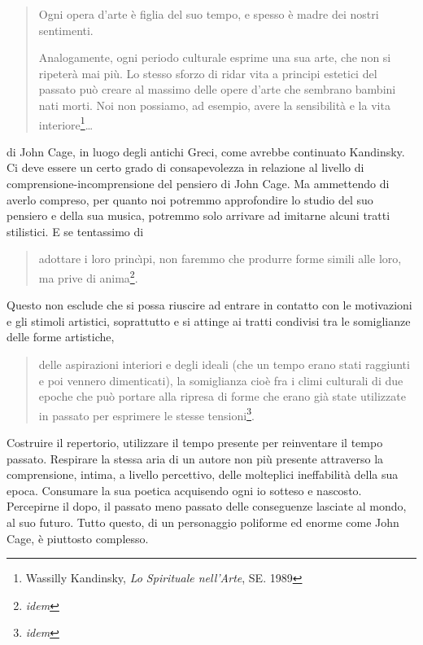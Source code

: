 \begin{multicols}{2}

\begin{quote}
	Ogni opera d'arte \`e figlia del suo tempo, e spesso \`e madre dei nostri
	sentimenti.

	Analogamente, ogni periodo culturale esprime una sua arte, che non si ripeter\`a mai pi\`u.
	Lo stesso sforzo di ridar vita a principi estetici del passato pu\`o creare al massimo delle opere d'arte che sembrano bambini nati morti.
	Noi non possiamo, ad esempio, avere la sensibilit\`a e la vita interiore\footnote{Wassilly Kandinsky, \emph{Lo Spirituale nell'Arte}, SE. 1989}\ldots
\end{quote}

di John Cage, in luogo degli antichi Greci, come avrebbe continuato Kandinsky.
Ci deve essere un certo grado di consapevolezza in relazione al livello di
comprensione-incomprensione del pensiero di John Cage. Ma ammettendo di
averlo compreso, per quanto noi potremmo approfondire lo studio del suo
pensiero e della sua musica, potremmo solo arrivare ad imitarne alcuni tratti
stilistici. E se tentassimo di

\begin{quote}
	adottare i loro princ\`{\i}pi, non faremmo che produrre forme simili alle loro, ma prive di anima\footnote{\emph{idem}}.
\end{quote}

Questo non esclude che si possa riuscire ad entrare in contatto con le
motivazioni e gli stimoli artistici, soprattutto
e si attinge ai tratti
condivisi tra le somiglianze delle forme artistiche,

\begin{quote}
	delle aspirazioni interiori e degli ideali (che un tempo erano stati raggiunti
	e poi vennero dimenticati), la somiglianza cio\`e fra i climi culturali di due
	epoche che pu\`o portare alla ripresa di forme che erano gi\`a state utilizzate in
	passato per esprimere le stesse tensioni\footnote{\emph{idem}}.
\end{quote}

Costruire il repertorio, utilizzare il tempo presente per reinventare il tempo passato.
Respirare la stessa aria di un autore non pi\`u presente attraverso la comprensione, intima,
a livello percettivo, delle molteplici ineffabilit\`a della sua epoca.
Consumare la sua poetica acquisendo ogni io sotteso e nascosto. Percepirne il dopo,
il passato meno passato delle conseguenze lasciate al mondo, al suo futuro.
Tutto questo, di un personaggio poliforme ed enorme come John Cage, \`e piuttosto complesso.


\end{multicols}
